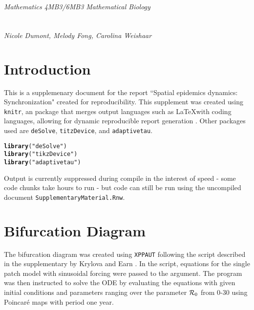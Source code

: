 \documentclass{article}\usepackage[]{graphicx}\usepackage[]{color}
\makeatletter
\newcommand{\hlstr}[1]{\textcolor[rgb]{0.192,0.494,0.8}{#1}}%
\newcommand{\hlstd}[1]{\textcolor[rgb]{0.345,0.345,0.345}{#1}}%
\newcommand{\hlkwd}[1]{\textcolor[rgb]{0.737,0.353,0.396}{\textbf{#1}}}%
\newenvironment{kframe}{%
 \def\at@end@of@kframe{}%
 \ifinner\ifhmode%
  \def\at@end@of@kframe{\end{minipage}}%
  \begin{minipage}{\columnwidth}%
 \fi\fi%
 \def\FrameCommand##1{\hskip\@totalleftmargin \hskip-\fboxsep
 \colorbox{shadecolor}{##1}\hskip-\fboxsep
     \hskip-\linewidth \hskip-\@totalleftmargin \hskip\columnwidth}%
 \MakeFramed {\advance\hsize-\width
   \@totalleftmargin\z@ \linewidth\hsize
   \@setminipage}}%
 {\par\unskip\endMakeFramed%
 \at@end@of@kframe}
\newenvironment{knitrout}{}{} %
\makeatother
\begin{document}
\begin{center}
{\emph{Mathematics 4MB3/6MB3 Mathematical Biology}\\
\smallskip
\huge  {} }\\
\medskip \medskip
{}\\
\emph{Nicole Dumont, Melody Fong, Carolina Weishaar}
 
\end{center}
\tableofcontents

\section{Introduction}
This is a supplemenary document for the report ``Spatial epidemics dynamics: Synchronization" created for reproducibility. This supplement was created using \verb|knitr|, an \Rlogo package that merges output languages such as \LaTeX  with coding languages, allowing for dynamic reproducible report generation \cite{Knitr}. Other packages used are \verb|deSolve|, \verb|titzDevice|, and \verb|adaptivetau|. 
\begin{knitrout}
\color{fgcolor}\begin{kframe}
\begin{alltt}
\hlkwd{library}\hlstd{(}\hlstr{"deSolve"}\hlstd{)}
\hlkwd{library}\hlstd{(}\hlstr{"tikzDevice"}\hlstd{)}
\hlkwd{library}\hlstd{(}\hlstr{"adaptivetau"}\hlstd{)}
\end{alltt}
\end{kframe}
\end{knitrout}
Output is currently suppressed during compile in the interest of speed - some code chunks take hours to run - but code can still be run using the uncompiled document \verb|SupplementaryMaterial.Rnw|.

\section{Bifurcation Diagram}
The bifurcation diagram was created using \verb|XPPAUT| following the script described in the supplementary by Krylova and Earn \cite{Krylova2013}. In the script, equations for the single patch model with sinusoidal forcing were passed to the argument. The program was then instructed to solve the ODE by evaluating the equations with given initial conditions and parameters ranging over the parameter ${\cal R}_0$ from 0-30 using Poincar\'{e} maps with period one year. \par \smallskip
\end{document}
